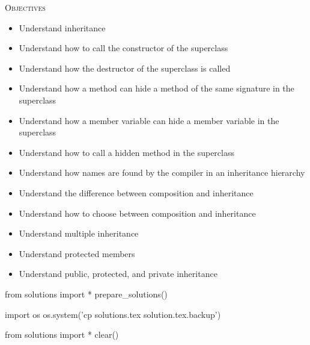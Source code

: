 
\textsc{Objectives}

\begin{itemize}
\item
  Understand inheritance
\item
  Understand how to call the constructor of the superclass
\item
  Understand how the destructor of the superclass is called
\item
  Understand how a method can hide a method of the same signature in the
  superclass
\item
  Understand how a member variable can hide a member variable in the
  superclass
\item
  Understand how to call a hidden method in the superclass
\item
  Understand how names are found by the compiler in an inheritance
  hierarchy
\item
  Understand the difference between composition and inheritance
\item
  Understand how to choose between composition and inheritance
\item
  Understand multiple inheritance
\item
  Understand protected members
\item
  Understand public, protected, and private inheritance
\end{itemize}













\begin{python0}
from solutions import *
prepare_solutions()
\end{python0}
\begin{python}
import os
os.system('cp solutions.tex solution.tex.backup')  
\end{python}

\begin{python0}
from solutions import *
clear()
\end{python0}
